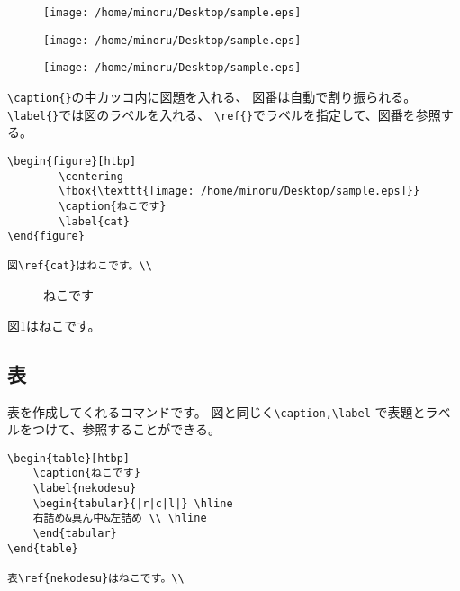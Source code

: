 \documentclass{jsarticle}
\begin{document}
\begin{figure}[htbp]
		\begin{flushleft}
				\texttt{[image: /home/minoru/Desktop/sample.eps]}
		\end{flushleft}
\end{figure}
\begin{figure}[htbp]
		\begin{center}
				\texttt{[image: /home/minoru/Desktop/sample.eps]}
		\end{center}
\end{figure}
\begin{figure}[htbp]
		\begin{flushright}
				\texttt{[image: /home/minoru/Desktop/sample.eps]}
		\end{flushright}
\end{figure}

\verb|\caption{}|の中カッコ内に図題を入れる、
図番は自動で割り振られる。
\verb|\label{}|では図のラベルを入れる、
\verb|\ref{}|でラベルを指定して、図番を参照する。\par

\begin{verbatim}
\begin{figure}[htbp]
		\centering
		\fbox{\texttt{[image: /home/minoru/Desktop/sample.eps]}}
		\caption{ねこです}
		\label{cat}
\end{figure}

図\ref{cat}はねこです。\\
\end{verbatim}

\begin{figure}[htbp]
		\centering
		\caption{ねこです}
		\label{cat}
\end{figure}

図\ref{cat}はねこです。\\

\subsection{表}
表を作成してくれるコマンドです。
図と同じく\verb|\caption,\label|
で表題とラベルをつけて、参照することができる。\par

\begin{verbatim}
\begin{table}[htbp]
	\caption{ねこです}
	\label{nekodesu}
	\begin{tabular}{|r|c|l|} \hline
	右詰め&真ん中&左詰め \\ \hline
	\end{tabular}
\end{table}

表\ref{nekodesu}はねこです。\\
\end{verbatim}
\end{document}
